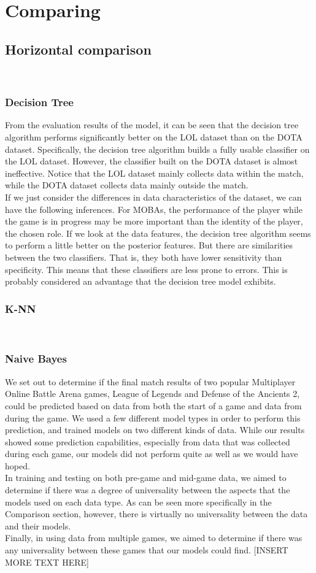 \documentclass[a4paper,fleqn]{cas-sc}
\begin{document}
\section{Comparing}
\subsection{Horizontal comparison}
\\
\subsubsection{Decision Tree}
From the evaluation results of the model, it can be seen that the decision tree algorithm performs significantly better on the LOL dataset than on the DOTA dataset. Specifically, the decision tree algorithm builds a fully usable classifier on the LOL dataset. However, the classifier built on the DOTA dataset is almost ineffective. Notice that the LOL dataset mainly collects data within the match, while the DOTA dataset collects data mainly outside the match.\\
If we just consider the differences in data characteristics of the dataset, we can have the following inferences. For MOBAs, the performance of the player while the game is in progress may be more important than the identity of the player, the chosen role. If we look at the data features, the decision tree algorithm seems to perform a little better on the posterior features. But there are similarities between the two classifiers. That is, they both have lower sensitivity than specificity. This means that these classifiers are less prone to errors. This is probably considered an advantage that the decision tree model exhibits.
\\
\subsubsection{K-NN}
\\
\subsubsection{Naive Bayes}
We set out to determine if the final match results of two popular Multiplayer Online Battle Arena games, League of Legends and Defense of the Ancients 2, could be predicted based on data from both the start of a game and data from during the game. We used a few different model types in order to perform this prediction, and trained models on two different kinds of data. While our results showed some prediction capabilities, especially from data that was collected during each game, our models did not perform quite as well as we would have hoped.\\
In training and testing on both pre-game and mid-game data, we aimed to determine if there was a degree of universality between the aspects that the models used on each data type. As can be seen more specifically in the Comparison section, however, there is virtually no universality between the data and their models.\\
Finally, in using data from multiple games, we aimed to determine if there was any universality between these games that our models could find. [INSERT MORE TEXT HERE]\\
\end{document}

